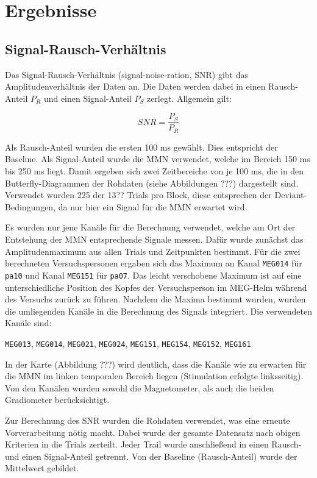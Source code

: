 \documentclass[doc,a4paper,12pt]{apa6}
\begin{document}
\newpage
\section{Ergebnisse}
\label{sec:ergebnisse}

\subsection{Signal-Rausch-Verhältnis}
\label{sec:snr}

Das Signal-Rausch-Verhältnis (signal-noise-ration, SNR) gibt das Amplitudenverhältnis der Daten an. Die Daten werden dabei in einen Rausch-Anteil $P_R$ und einen Signal-Anteil $P_S$ zerlegt. Allgemein gilt:

\begin{equation}
SNR = \frac{P_S}{P_R}
\end{equation}

Als Rausch-Anteil wurden die ersten 100 ms gewählt. Dies entspricht der Baseline. Als Signal-Anteil wurde die MMN verwendet, welche im Bereich 150 ms bis 250 ms liegt. Damit ergeben sich zwei Zeitbereiche von je 100 ms, die in den Butterfly-Diagrammen der Rohdaten (siehe Abbildungen ???) dargestellt sind. Verwendet wurden 225 der 13?? Trials pro Block, diese entsprechen der Deviant-Bedingungen, da nur hier ein Signal für die MMN erwartet wird.

Es wurden nur jene Kanäle für die Berechnung verwendet, welche am Ort der Entstehung der MMN entsprechende Signale messen. Dafür wurde zunächst das Amplitudenmaximum aus allen Trials und Zeitpunkten bestimmt. Für die zwei berechneten Versuchspersonen ergaben sich das Maximum an Kanal \texttt{MEG014} für \texttt{pa10} und Kanal \texttt{MEG151} für \texttt{pa07}. Das leicht verschobene Maximum ist auf eine unterschiedliche Position des Kopfes der Versuchsperson im MEG-Helm während des Versuchs zurück zu führen. Nachdem die Maxima bestimmt wurden, wurden die umliegenden Kanäle in die Berechnung des Signals integriert. Die verwendeten Kanäle sind:

\texttt{MEG013}, \texttt{MEG014}, \texttt{MEG021}, \texttt{MEG024}, \texttt{MEG151}, \texttt{MEG154}, \texttt{MEG152}, \texttt{MEG161}

In der Karte (Abbildung ???) wird deutlich, dass die Kanäle wie zu erwarten für die MMN im linken temporalen Bereich liegen (Stimulation erfolgte linksseitig). Von den Kanälen wurden sowohl die Magnetometer, als auch die beiden Gradiometer berücksichtigt.

Zur Berechnung des SNR wurden die Rohdaten verwendet, was eine erneute Vorverarbeitung nötig macht. Dabei wurde der gesamte Datensatz nach obigen Kriterien in die Trials zerteilt. Jeder Trail wurde anschließend in einen Rausch- und einen Signal-Anteil getrennt. Von der Baseline (Rausch-Anteil) wurde der Mittelwert gebildet.
\end{document}
